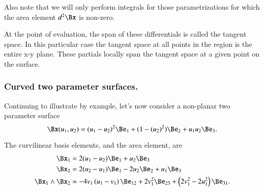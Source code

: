Also note that we will only perform integrals for those parametrizations for which the area element \( d^2 \Bx \) is non-zero.




At the point of evaluation, the span of these differentials is called the tangent space.
In this particular case the tangent space at all points in the region is the entire x-y plane.
These partials locally span the tangent space at a given point on the surface.

\subsubsection{Curved two parameter surfaces.}

Continuing to illustrate by example, let's now consider a non-planar two parameter surface
\begin{dmath}\label{eqn:curvilinearDefined:560}
\Bx(u_1, u_2) =
(u_1-u_2)^2
\Be_1
+ (1-(u_2)^2 ) \Be_2
+ u_1 u_2 \Be_3.
\end{dmath}

The curvilinear basis elements, and the area element, are
\begin{dmath}\label{eqn:curvilinearDefined:580}
\begin{aligned}
\Bx_1 &= 2 (u_1 - u_2) \Be_1 + u_2 \Be_3 \\
\Bx_2 &= 2 (u_2 - u_1) \Be_1 - 2 u_2 \Be_2 + u_1 \Be_3 \\
\Bx_1 \wedge \Bx_2 &=
-4 v_1
\left(u_1-v_1\right)
\Be_{12}
+2 v_1^2 \Be_{23}
+
\left(2 v_1^2-2 u_1^2\right)
\Be_{31}.
\end{aligned}
\end{dmath}

